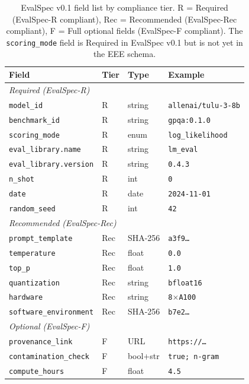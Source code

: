 \documentclass[11pt]{article}
\begin{document}
\begin{table}[h]
\centering
\small
\setlength{\tabcolsep}{3pt}
\caption{EvalSpec v0.1 field list by compliance tier.
R = Required (EvalSpec-R compliant), Rec = Recommended
(EvalSpec-Rec compliant), F = Full optional fields
(EvalSpec-F compliant). The \texttt{scoring\_mode} field is
Required in EvalSpec v0.1 but is not yet in the EEE schema.}
\label{tab:evalspec_fields}
\begin{tabular}{llll}
\toprule
\textbf{Field} & \textbf{Tier} & \textbf{Type} & \textbf{Example} \\
\midrule
\multicolumn{4}{l}{\emph{Required (EvalSpec-R)}} \\
\texttt{model\_id}             & R & string & \texttt{allenai/tulu-3-8b} \\
\texttt{benchmark\_id}         & R & string & \texttt{gpqa:0.1.0} \\
\texttt{scoring\_mode}         & R & enum   & \texttt{log\_likelihood} \\
\texttt{eval\_library.name}    & R & string & \texttt{lm\_eval} \\
\texttt{eval\_library.version} & R & string & \texttt{0.4.3} \\
\texttt{n\_shot}               & R & int    & \texttt{0} \\
\texttt{date}                  & R & date   & \texttt{2024-11-01} \\
\texttt{random\_seed}          & R & int    & \texttt{42} \\
\midrule
\multicolumn{4}{l}{\emph{Recommended (EvalSpec-Rec)}} \\
\texttt{prompt\_template}      & Rec & SHA-256 & \texttt{a3f9\ldots} \\
\texttt{temperature}           & Rec & float   & \texttt{0.0} \\
\texttt{top\_p}                & Rec & float   & \texttt{1.0} \\
\texttt{quantization}          & Rec & string  & \texttt{bfloat16} \\
\texttt{hardware}              & Rec & string  & \texttt{8$\times$A100} \\
\texttt{software\_environment} & Rec & SHA-256 & \texttt{b7e2\ldots} \\
\midrule
\multicolumn{4}{l}{\emph{Optional (EvalSpec-F)}} \\
\texttt{provenance\_link}      & F & URL      & \texttt{https://\ldots} \\
\texttt{contamination\_check}  & F & bool+str & \texttt{true; n-gram} \\
\texttt{compute\_hours}        & F & float    & \texttt{4.5} \\
\bottomrule
\end{tabular}
\end{table}
\end{document}

